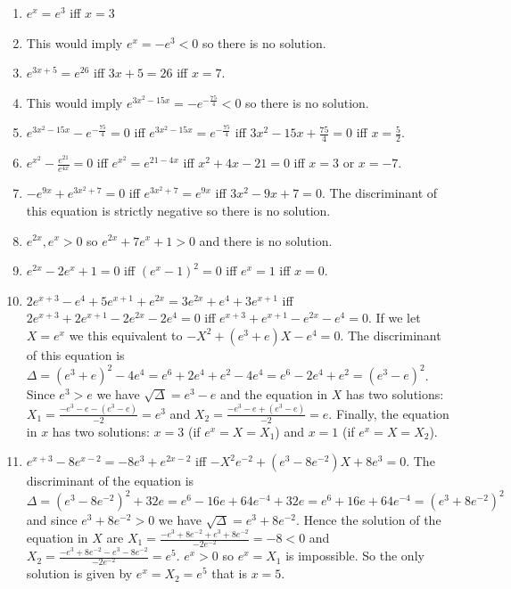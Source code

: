 \begin{enumerate}
\item $e^{x} = e^3$ iff $x = 3$
\item This would imply $e^{x} = -e^3 < 0$ so there is no solution.
\item $e^{3x+5} = e^{26}$ iff $3x+5=26$ iff $x = 7$.
\item This would imply $e^{3x^2 - 15x} = -e^{-\frac{75}{4}} < 0$
  so there is no solution.
\item $e^{3x^2 - 15x} - e^{-\frac{75}{4}} = 0$ iff
  $e^{3x^2 - 15x} = e^{-\frac{75}{4}}$ iff
  $3x^2 - 15x + \frac{75}{4} = 0$ iff $x = \frac{5}{2}$.
\item $e^{x^2} - \frac{e^{21}}{e^{4x}} = 0$ iff
  $e^{x^2} = e^{21-4x}$ iff $x^2 + 4x - 21 = 0$ iff $x=3$ or $x = -7$.
\item $-e^{9x} + e^{3x^2+7}= 0$ iff $e^{3x^2+7} =e^{9x}$
  iff $3x^2 - 9x + 7 = 0$. The discriminant of this equation is
  strictly negative so there is no solution.
\item $e^{2x}, e^x > 0$ so $e^{2x} + 7 e^x + 1 > 0$ and there is no solution.
\item $e^{2x} - 2 e^x + 1 = 0$
  iff ${(e^x - 1)}^2 = 0$ iff $e^x = 1$ iff $x = 0$.
\item $2 e^{x+3} - e^4 + 5e^{x+1} + e^{2x} = 3e^{2x} + e^4 + 3e^{x+1}$ iff
  $2 e^{x+3} + 2e^{x+1} -2e^{2x} - 2e^4 = 0$ iff
  $e^{x+3} + e^{x+1} -e^{2x} - e^4 = 0$. If we let $X = e^x$ we this equivalent
  to $-X^2 + {(e^3 + e)} X - e^4 = 0$. The discriminant of this equation
  is $\Delta = {(e^3+e)}^2 - 4 e^4 = e^6 + 2e^4 + e^2 - 4e^4 =
  e^6 - 2e^4 + e^2 = {(e^3-e)}^2$. Since $e^3 > e$ we have
  $\sqrt{\Delta} = e^3 - e$ and the equation in $X$ has two solutions:
  $X_1 = \frac{-e^3-e-{(e^3 - e)}}{-2} = e^3$ and
  $X_2 = \frac{-e^3-e+{(e^3 - e)}}{-2} = e$.
  Finally, the equation in $x$ has two solutions: $x = 3$ (if $e^x = X = X_1$)
  and $x=1$ (if $e^x = X = X_2$).
\item $e^{x+3} - 8 e^{x-2} = -8 e^3 + e^{2x-2}$ iff
  $-X^2 e^{-2} + {(e^3 - 8 e^{-2})} X + 8e^3 = 0$.
  The discriminant of the equation
  is $\Delta = {(e^3-8e^{-2})}^2 + 32 e =
  e^6 -16e + 64e^{-4} + 32e = e^6 +16e + 64e^{-4} = {(e^3+8e^{-2})}^2$
  and since $e^3+8e^{-2} > 0$ we have $\sqrt{\Delta} = e^3+8e^{-2}$.
  Hence the solution of the equation in $X$ are
  $X_1 = \frac{-e^3 + 8 e^{-2} + e^3+8e^{-2}}{-2e^{-2}} = -8 < 0$
  and $X_2 = \frac{-e^3 + 8 e^{-2} - e^3-8e^{-2}}{-2e^{-2}} = e^{5}$.
  $e^x > 0$ so $e^x = X_1$ is impossible. So the only solution is given
  by $e^x = X_2 = e^{5}$ that is $x = 5$.


\end{enumerate}
